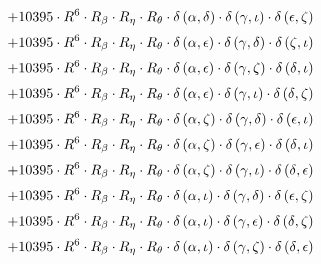 \begin{subequations}
\begin{gather}
 \\[0.2em] \notag 		 + 10395 \cdot R^{6} \cdot R_{\beta{}} \cdot R_{\eta{}} \cdot R_{\theta{}} \cdot \delta{}\left(\alpha{}, \delta{}\right) \cdot \delta{}\left(\gamma{}, \iota{}\right) \cdot \delta{}\left(\epsilon{}, \zeta{}\right) 
 \\[0.2em] \notag 		 + 10395 \cdot R^{6} \cdot R_{\beta{}} \cdot R_{\eta{}} \cdot R_{\theta{}} \cdot \delta{}\left(\alpha{}, \epsilon{}\right) \cdot \delta{}\left(\gamma{}, \delta{}\right) \cdot \delta{}\left(\zeta{}, \iota{}\right) 
 \\[0.2em] \notag 		 + 10395 \cdot R^{6} \cdot R_{\beta{}} \cdot R_{\eta{}} \cdot R_{\theta{}} \cdot \delta{}\left(\alpha{}, \epsilon{}\right) \cdot \delta{}\left(\gamma{}, \zeta{}\right) \cdot \delta{}\left(\delta{}, \iota{}\right) 
 \\[0.2em] \notag 		 + 10395 \cdot R^{6} \cdot R_{\beta{}} \cdot R_{\eta{}} \cdot R_{\theta{}} \cdot \delta{}\left(\alpha{}, \epsilon{}\right) \cdot \delta{}\left(\gamma{}, \iota{}\right) \cdot \delta{}\left(\delta{}, \zeta{}\right) 
 \\[0.2em] \notag 		 + 10395 \cdot R^{6} \cdot R_{\beta{}} \cdot R_{\eta{}} \cdot R_{\theta{}} \cdot \delta{}\left(\alpha{}, \zeta{}\right) \cdot \delta{}\left(\gamma{}, \delta{}\right) \cdot \delta{}\left(\epsilon{}, \iota{}\right) 
 \\[0.2em] \notag 		 + 10395 \cdot R^{6} \cdot R_{\beta{}} \cdot R_{\eta{}} \cdot R_{\theta{}} \cdot \delta{}\left(\alpha{}, \zeta{}\right) \cdot \delta{}\left(\gamma{}, \epsilon{}\right) \cdot \delta{}\left(\delta{}, \iota{}\right) 
 \\[0.2em] \notag 		 + 10395 \cdot R^{6} \cdot R_{\beta{}} \cdot R_{\eta{}} \cdot R_{\theta{}} \cdot \delta{}\left(\alpha{}, \zeta{}\right) \cdot \delta{}\left(\gamma{}, \iota{}\right) \cdot \delta{}\left(\delta{}, \epsilon{}\right) 
 \\[0.2em] \notag 		 + 10395 \cdot R^{6} \cdot R_{\beta{}} \cdot R_{\eta{}} \cdot R_{\theta{}} \cdot \delta{}\left(\alpha{}, \iota{}\right) \cdot \delta{}\left(\gamma{}, \delta{}\right) \cdot \delta{}\left(\epsilon{}, \zeta{}\right) 
 \\[0.2em] \notag 		 + 10395 \cdot R^{6} \cdot R_{\beta{}} \cdot R_{\eta{}} \cdot R_{\theta{}} \cdot \delta{}\left(\alpha{}, \iota{}\right) \cdot \delta{}\left(\gamma{}, \epsilon{}\right) \cdot \delta{}\left(\delta{}, \zeta{}\right) 
 \\[0.2em] \notag 		 + 10395 \cdot R^{6} \cdot R_{\beta{}} \cdot R_{\eta{}} \cdot R_{\theta{}} \cdot \delta{}\left(\alpha{}, \iota{}\right) \cdot \delta{}\left(\gamma{}, \zeta{}\right) \cdot \delta{}\left(\delta{}, \epsilon{}\right) 

\end{gather}
\end{subequations}
